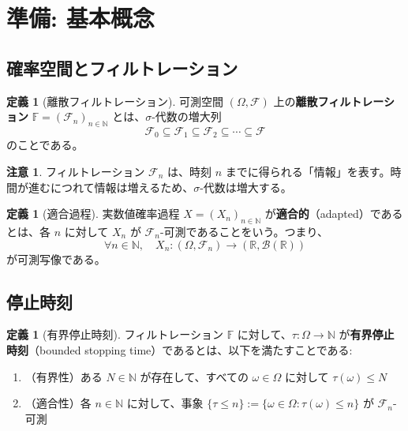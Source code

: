 \documentclass[a4paper,12pt]{ltjsarticle}
\theoremstyle{definition}
\newtheorem{definition}[theorem]{定義}
\newtheorem{remark}[theorem]{注意}
\begin{document}
\section{準備: 基本概念}

\subsection{確率空間とフィルトレーション}

\begin{definition}[離散フィルトレーション]
可測空間 $(\Omega, \mathcal{F})$ 上の\textbf{離散フィルトレーション} $\mathbb{F} = (\mathcal{F}_n)_{n \in \mathbb{N}}$ とは、$\sigma$-代数の増大列
\[
\mathcal{F}_0 \subseteq \mathcal{F}_1 \subseteq \mathcal{F}_2 \subseteq \cdots \subseteq \mathcal{F}
\]
のことである。
\end{definition}

\begin{remark}
フィルトレーション $\mathcal{F}_n$ は、時刻 $n$ までに得られる「情報」を表す。時間が進むにつれて情報は増えるため、$\sigma$-代数は増大する。
\end{remark}

\begin{definition}[適合過程]
実数値確率過程 $X = (X_n)_{n \in \mathbb{N}}$ が\textbf{適合的}（adapted）であるとは、各 $n$ に対して $X_n$ が $\mathcal{F}_n$-可測であることをいう。つまり、
\[
\forall n \in \mathbb{N}, \quad X_n : (\Omega, \mathcal{F}_n) \to (\mathbb{R}, \mathcal{B}(\mathbb{R}))
\]
が可測写像である。
\end{definition}

\subsection{停止時刻}

\begin{definition}[有界停止時刻]
フィルトレーション $\mathbb{F}$ に対して、$\tau : \Omega \to \mathbb{N}$ が\textbf{有界停止時刻}（bounded stopping time）であるとは、以下を満たすことである:
\begin{enumerate}
\item （有界性）ある $N \in \mathbb{N}$ が存在して、すべての $\omega \in \Omega$ に対して $\tau(\omega) \leq N$
\item （適合性）各 $n \in \mathbb{N}$ に対して、事象 $\{\tau \leq n\} := \{\omega \in \Omega : \tau(\omega) \leq n\}$ が $\mathcal{F}_n$-可測
\end{enumerate}
\end{definition}
\end{document}
